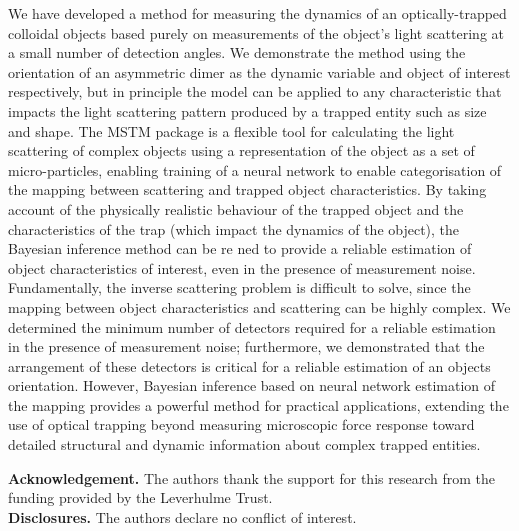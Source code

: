 \documentclass[12pt]{spieman}
\begin{document}
\begin{spacing}{1.5}
We have developed a method for measuring the dynamics of an optically-trapped colloidal objects based purely on measurements of the object's light scattering at a small number of detection angles. We demonstrate the method using the orientation of an asymmetric dimer as the dynamic variable and object of interest respectively, but in principle the model can be applied to any characteristic that impacts the light scattering pattern produced by a trapped entity such as size and shape. The MSTM package is a flexible tool for calculating the light scattering of complex objects using a representation of the object as a set of micro-particles, enabling training of a neural network to enable categorisation of the mapping between scattering and trapped object characteristics. By taking account of the physically realistic behaviour of the trapped object and the characteristics of the trap (which impact the dynamics of the object), the Bayesian inference method can be re ned to provide a reliable estimation of object characteristics of interest, even in the presence of measurement noise. Fundamentally, the inverse scattering problem is difficult to solve, since the mapping between object characteristics and scattering can be highly complex. We determined the minimum number of detectors required for a reliable estimation in the presence of measurement noise; furthermore, we demonstrated that the arrangement of these detectors is critical for a reliable estimation of an objects orientation. However, Bayesian inference based on neural network estimation of the mapping provides a powerful method for practical applications, extending the use of optical trapping beyond measuring microscopic force response toward detailed structural and dynamic information about complex trapped entities. 
\end{spacing}

\noindent \textbf{Acknowledgement.} The authors thank the support for this research from the funding provided by the Leverhulme Trust. \\
  
\noindent \textbf{Disclosures.} The authors declare no conflict of interest. \\


 

\end{document}
